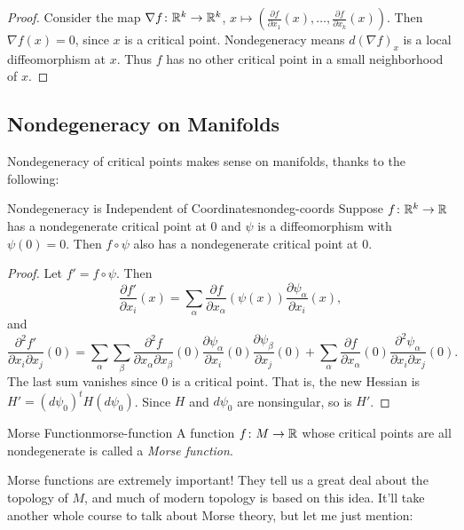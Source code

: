 \begin{proof}
    Consider the map $\nabla f \colon \mathbb{R}^k \to \mathbb{R}^k$, $x \mapsto \left(\frac{\partial f}{\partial x_1}(x), \ldots, \frac{\partial f}{\partial x_k}(x)\right)$. Then $\nabla f(x) = 0$, since $x$ is a critical point. Nondegeneracy means $d(\nabla f)_x$ is a local diffeomorphism at $x$. Thus $f$ has no other critical point in a small neighborhood of $x$.
\end{proof}

\subsection{Nondegeneracy on Manifolds}

Nondegeneracy of critical points makes sense on manifolds, thanks to the following:

\begin{lemma}{Nondegeneracy is Independent of Coordinates}{nondeg-coords}
    Suppose $f \colon \mathbb{R}^k \to \mathbb{R}$ has a nondegenerate critical point at $0$ and $\psi$ is a diffeomorphism with $\psi(0) = 0$. Then $f \circ \psi$ also has a nondegenerate critical point at $0$.
\end{lemma}

\begin{proof}
    Let $f' = f \circ \psi$. Then
    \[
        \frac{\partial f'}{\partial x_i}(x) = \sum_\alpha \frac{\partial f}{\partial x_\alpha}(\psi(x)) \frac{\partial \psi_\alpha}{\partial x_i}(x),
    \]
    and
    \[
        \frac{\partial^2 f'}{\partial x_i \partial x_j}(0) = \sum_\alpha \sum_\beta \frac{\partial^2 f}{\partial x_\alpha \partial x_\beta}(0) \frac{\partial \psi_\alpha}{\partial x_i}(0) \frac{\partial \psi_\beta}{\partial x_j}(0) + \sum_\alpha \frac{\partial f}{\partial x_\alpha}(0) \frac{\partial^2 \psi_\alpha}{\partial x_i \partial x_j}(0).
    \]
    The last sum vanishes since $0$ is a critical point. That is, the new Hessian is $H' = (d\psi_0)^t H (d\psi_0)$. Since $H$ and $d\psi_0$ are nonsingular, so is $H'$.
\end{proof}

\begin{definition}{Morse Function}{morse-function}
    A function $f \colon M \to \mathbb{R}$ whose critical points are all nondegenerate is called a \emph{Morse function}.
\end{definition}

Morse functions are extremely important! They tell us a great deal about the topology of $M$, and much of modern topology is based on this idea. It'll take another whole course to talk about Morse theory, but let me just mention:

